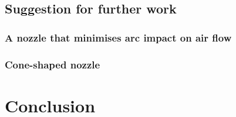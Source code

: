 \documentclass[10pt,a4paper,twoside]{article}
\begin{document}
\newpage
\subsection{Suggestion for further work}
\subsubsection{A nozzle that minimises arc impact on air flow}


\subsubsection{Cone-shaped nozzle}


\cleardoublepage

\section{Conclusion}
\end{document}
